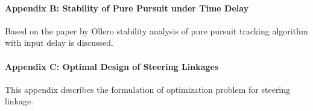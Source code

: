 \paragraph*{Appendix B:  Stability of Pure Pursuit  under Time Delay \\}
Based on the paper by Ollero \cite{ollero1995stability} stability analysis of pure pursuit tracking algorithm with input delay is discussed.
\paragraph*{Appendix C:  Optimal Design of Steering Linkages \\} 
This appendix describes the formulation of optimization problem for steering linkage.